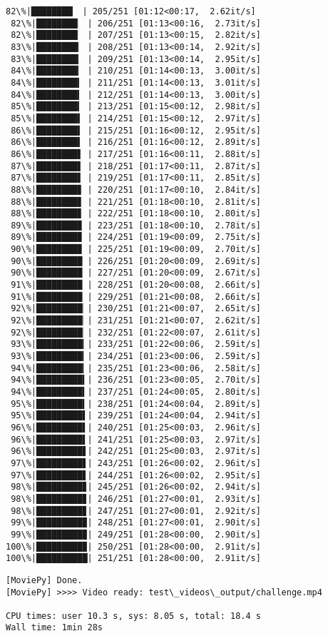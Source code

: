 \documentclass[11pt]{article}
\begin{document}
\begin{Verbatim}[commandchars=\\\{\}]
 82\%|████████▏ | 205/251 [01:12<00:17,  2.62it/s]
 82\%|████████▏ | 206/251 [01:13<00:16,  2.73it/s]
 82\%|████████▏ | 207/251 [01:13<00:15,  2.82it/s]
 83\%|████████▎ | 208/251 [01:13<00:14,  2.92it/s]
 83\%|████████▎ | 209/251 [01:13<00:14,  2.95it/s]
 84\%|████████▎ | 210/251 [01:14<00:13,  3.00it/s]
 84\%|████████▍ | 211/251 [01:14<00:13,  3.01it/s]
 84\%|████████▍ | 212/251 [01:14<00:13,  3.00it/s]
 85\%|████████▍ | 213/251 [01:15<00:12,  2.98it/s]
 85\%|████████▌ | 214/251 [01:15<00:12,  2.97it/s]
 86\%|████████▌ | 215/251 [01:16<00:12,  2.95it/s]
 86\%|████████▌ | 216/251 [01:16<00:12,  2.89it/s]
 86\%|████████▋ | 217/251 [01:16<00:11,  2.88it/s]
 87\%|████████▋ | 218/251 [01:17<00:11,  2.87it/s]
 87\%|████████▋ | 219/251 [01:17<00:11,  2.85it/s]
 88\%|████████▊ | 220/251 [01:17<00:10,  2.84it/s]
 88\%|████████▊ | 221/251 [01:18<00:10,  2.81it/s]
 88\%|████████▊ | 222/251 [01:18<00:10,  2.80it/s]
 89\%|████████▉ | 223/251 [01:18<00:10,  2.78it/s]
 89\%|████████▉ | 224/251 [01:19<00:09,  2.75it/s]
 90\%|████████▉ | 225/251 [01:19<00:09,  2.70it/s]
 90\%|█████████ | 226/251 [01:20<00:09,  2.69it/s]
 90\%|█████████ | 227/251 [01:20<00:09,  2.67it/s]
 91\%|█████████ | 228/251 [01:20<00:08,  2.66it/s]
 91\%|█████████ | 229/251 [01:21<00:08,  2.66it/s]
 92\%|█████████▏| 230/251 [01:21<00:07,  2.65it/s]
 92\%|█████████▏| 231/251 [01:21<00:07,  2.62it/s]
 92\%|█████████▏| 232/251 [01:22<00:07,  2.61it/s]
 93\%|█████████▎| 233/251 [01:22<00:06,  2.59it/s]
 93\%|█████████▎| 234/251 [01:23<00:06,  2.59it/s]
 94\%|█████████▎| 235/251 [01:23<00:06,  2.58it/s]
 94\%|█████████▍| 236/251 [01:23<00:05,  2.70it/s]
 94\%|█████████▍| 237/251 [01:24<00:05,  2.80it/s]
 95\%|█████████▍| 238/251 [01:24<00:04,  2.89it/s]
 95\%|█████████▌| 239/251 [01:24<00:04,  2.94it/s]
 96\%|█████████▌| 240/251 [01:25<00:03,  2.96it/s]
 96\%|█████████▌| 241/251 [01:25<00:03,  2.97it/s]
 96\%|█████████▋| 242/251 [01:25<00:03,  2.97it/s]
 97\%|█████████▋| 243/251 [01:26<00:02,  2.96it/s]
 97\%|█████████▋| 244/251 [01:26<00:02,  2.95it/s]
 98\%|█████████▊| 245/251 [01:26<00:02,  2.94it/s]
 98\%|█████████▊| 246/251 [01:27<00:01,  2.93it/s]
 98\%|█████████▊| 247/251 [01:27<00:01,  2.92it/s]
 99\%|█████████▉| 248/251 [01:27<00:01,  2.90it/s]
 99\%|█████████▉| 249/251 [01:28<00:00,  2.90it/s]
100\%|█████████▉| 250/251 [01:28<00:00,  2.91it/s]
100\%|██████████| 251/251 [01:28<00:00,  2.91it/s]
    \end{Verbatim}

    \begin{Verbatim}[commandchars=\\\{\}]
[MoviePy] Done.
[MoviePy] >>>> Video ready: test\_videos\_output/challenge.mp4 

CPU times: user 10.3 s, sys: 8.05 s, total: 18.4 s
Wall time: 1min 28s

    \end{Verbatim}
\end{document}
